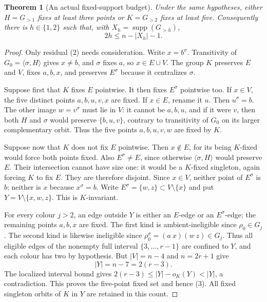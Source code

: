 \documentclass[11pt,a4paper]{article}
\newtheorem{theorem}{Theorem}
\newcommand{\gen}[1]{\langle#1\rangle}
\begin{document}
\begin{theorem}[An actual fixed-support budget]
Under the same hypotheses, either $H=G_{>1}$ fixes at least three
points or $K=G_{>2}$ fixes at least five. Consequently there is
$h\in\{1,2\}$ such that, with $X_h=\operatorname{supp}(G_{>h})$,
\[
                         2h\le n-|X_h|-1.              \tag{3}
\]
\end{theorem}
\begin{proof}
Only residual (2) needs consideration. Write $x=b^\sigma$.
Transitivity of $G_0=\gen{\sigma,H}$ gives $x\ne b$, and
$\sigma$ fixes $a$, so $x\in E\cup V$. The group $K$ preserves
$E$ and $V$, fixes $a,b,x$, and preserves $E^\sigma$ because
it centralizes $\sigma$.

Suppose first that $K$ fixes $E$ pointwise. It then fixes
$E^\sigma$ pointwise too. If $x\in V$, the five distinct points
$a,b,u,v,x$ are fixed. If $x\in E$, rename it $u$.
Then $u^\sigma=b$. The other image $w=v^\sigma$ must lie in
$V$: it cannot be $a,b,u$, and if it were $v$, then both $H$
and $\sigma$ would preserve $\{b,u,v\}$, contrary to transitivity
of $G_0$ on its larger complementary orbit. Thus the five points
$a,b,u,v,w$ are fixed by $K$.

Suppose now that $K$ does not fix $E$ pointwise. Then $x\notin E$,
for its being $K$-fixed would force both points fixed. Also
$E^\sigma\ne E$, since otherwise $\gen{\sigma,H}$ would
preserve $E$. Their intersection cannot have size one: it would
be a $K$-fixed singleton, again forcing $K$ to fix $E$.
They are therefore disjoint. Since $x\in V$, neither point of
$E^\sigma$ is $b$; neither is $x$ because $x^\sigma=b$.
Write $E^\sigma=\{w,z\}\subset V\setminus\{x\}$ and put
$Y=V\setminus\{x,w,z\}$. This is $K$-invariant.

For every colour $j>2$, an edge outside $Y$ is either an $E$-edge
or an $E^\sigma$-edge; the remaining points $a,b,x$ are fixed.
The first kind is ambient-ineligible since $\rho_0\in G_j$.
The second kind is likewise ineligible since
$\rho_0^\sigma=(a\ x)(w\ z)\in G_j$.
Thus all eligible edges of the nonempty full interval $\{3,\ldots,r-1\}$
are confined to $Y$, and each colour has two by hypothesis.
But $|V|=n-4$ and $n=2r+1$ give
\[
               |Y|=n-7=2(r-3).
\]
The localized interval bound gives $2(r-3)\le |Y|-o_K(Y)<|Y|$,
a contradiction. This proves the five-point fixed set and hence (3).
All fixed singleton orbits of $K$ in $Y$ are retained in this count.
\end{proof}
\end{document}
